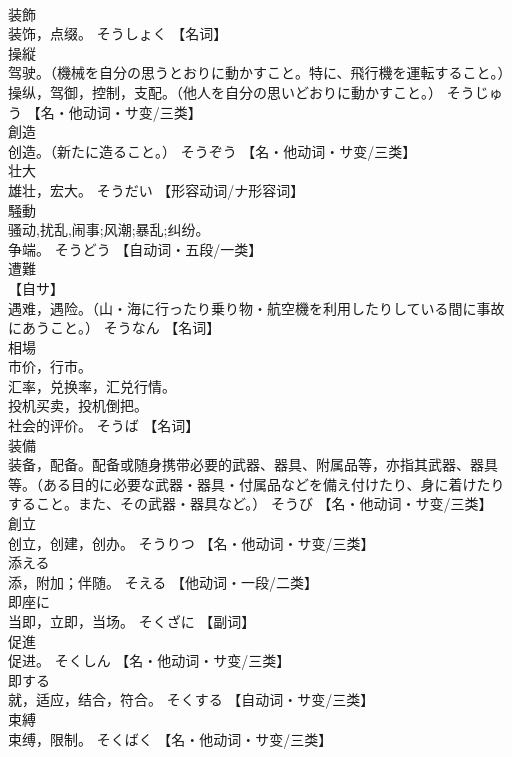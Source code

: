 \documentclass[8pt]{extreport}
\begin{document}
\begin{CJK}{UTF8}{min}
\\	装飾	
\\	装饰，点缀。	そうしょく		【名词】
\\	操縦	
\\	驾驶。（機械を自分の思うとおりに動かすこと。特に、飛行機を運転すること。） 
\\	操纵，驾御，控制，支配。（他人を自分の思いどおりに動かすこと。）	そうじゅう		【名・他动词・サ变/三类】
\\	創造	
\\	创造。（新たに造ること。）	そうぞう		【名・他动词・サ变/三类】
\\	壮大	
\\	雄壮，宏大。	そうだい		【形容动词/ナ形容词】
\\	騒動	
\\	骚动,扰乱,闹事;风潮;暴乱;纠纷。 
\\	争端。	そうどう		【自动词・五段/一类】
\\	遭難	
\\	【自サ】 
\\	遇难，遇险。（山・海に行ったり乗り物・航空機を利用したりしている間に事故にあうこと。）	そうなん		【名词】
\\	相場	
\\	市价，行市。 
\\	汇率，兑换率，汇兑行情。 
\\	投机买卖，投机倒把。 
\\	社会的评价。	そうば		【名词】
\\	装備	
\\	装备，配备。配备或随身携带必要的武器、器具、附属品等，亦指其武器、器具等。（ある目的に必要な武器・器具・付属品などを備え付けたり、身に着けたりすること。また、その武器・器具など。）	そうび		【名・他动词・サ变/三类】
\\	創立	
\\	创立，创建，创办。	そうりつ		【名・他动词・サ变/三类】
\\	添える	
\\	添，附加；伴随。	そえる		【他动词・一段/二类】
\\	即座に	
\\	当即，立即，当场。	そくざに		【副词】
\\	促進	
\\	促进。	そくしん		【名・他动词・サ变/三类】
\\	即する	
\\	就，适应，结合，符合。	そくする		【自动词・サ变/三类】
\\	束縛	
\\	束缚，限制。	そくばく		【名・他动词・サ变/三类】

\end{CJK}
\end{document}
